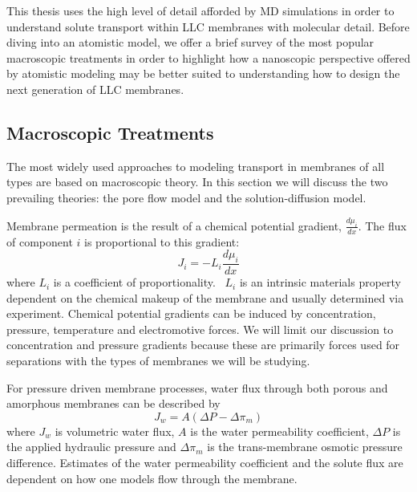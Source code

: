   This thesis uses the high level of detail afforded by MD simulations in
  order to understand solute transport within LLC membranes with molecular 
  detail. Before diving into an atomistic model, we offer a brief survey of 
  the most popular macroscopic treatments in order to highlight how a 
  nanoscopic perspective offered by atomistic modeling may be better suited to 
  understanding how to design the next generation of LLC membranes.

  \subsection{Macroscopic Treatments}
  
  The most widely used approaches to modeling transport in membranes of all types
  are based on macroscopic theory. In this section we will discuss the two prevailing
  theories: the pore flow model and the solution-diffusion model.
  
  Membrane permeation is the result of a chemical potential gradient, $\frac{d\mu_i}{dx}$.
  The flux of component $i$ is proportional to this gradient:
  \begin{equation}
    J_i = -L_i \frac{d\mu_i}{dx}
  \end{equation}
  where $L_i$ is a coefficient of proportionality.~\cite{wijmans_solution-diffusion_1995}
  $L_i$ is an intrinsic materials property dependent on the chemical makeup of
  the membrane and usually determined via experiment. Chemical potential gradients
  can be induced by concentration, pressure, temperature
  and electromotive forces. We will limit our discussion to concentration and pressure
  gradients because these are primarily forces used for separations with the types of 
  membranes we will be studying.

  For pressure driven membrane processes, water flux through both porous and 
  amorphous membranes can be described by
  \begin{equation}
  J_w = A(\Delta P - \Delta \pi_m)
  \end{equation}
  where $J_w$ is volumetric water flux, $A$ is the water permeability coefficient,
  $\Delta P$ is the applied hydraulic pressure and $\Delta \pi_m$ is the 
  trans-membrane osmotic pressure difference. Estimates of the water permeability 
  coefficient and the solute flux are dependent on how one models flow through the 
  membrane.

